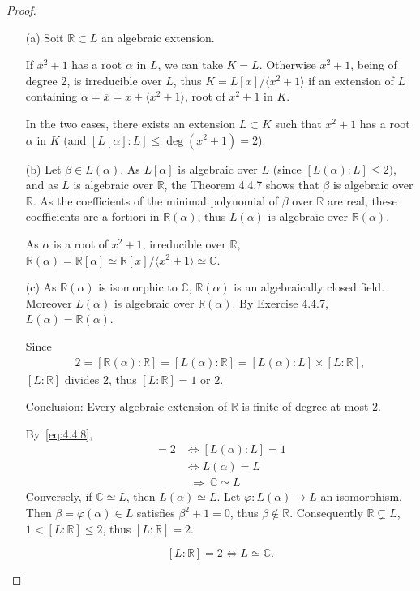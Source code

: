 \documentclass[11pt,a4paper]{article}
\newcommand{\R}{\mathbb{R}}
\newcommand{\C}{\mathbb{C}}
\begin{document}
\begin{proof}
\begin{enumerate}
\item[(a)]
Soit $\R \subset L$ an algebraic extension. 

If  $x^2+1$ has a root $\alpha$ in $L$, we can take  $K=L$. Otherwise $x^2+1$, being of degree 2, is irreducible over $L$, thus $K = L[x]/\langle x^2 +1\rangle$ if an extension of $L$ containing $\alpha = \overline{x} = x +\langle x^2 +1\rangle $, root of $x^2+1$ in $K$. 

In the two cases, there exists  an extension $L \subset K$ such that $x^2+1$ has a root $\alpha$ in $K$ (and $ [L[\alpha]:L] \leq \deg(x^2+1) = 2$).

\item[(b)] Let $\beta \in L(\alpha)$. As $L[\alpha]$ is algebraic over $L$ (since $[L(\alpha) : L] \leq 2)$, and as $L$ is algebraic over $\R$, the Theorem 4.4.7 shows that $\beta$ is algebraic over $\R$. As the coefficients of the minimal polynomial of $\beta$ over $\R$ are real, these coefficients are a fortiori in $\R(\alpha)$, thus $L(\alpha)$ is algebraic over $\R(\alpha)$.

As  $\alpha$ is a root of $x^2+1$, irreducible over $\R$, $\R(\alpha) = \R[\alpha] \simeq \R[x]/\langle x^2+1\rangle \simeq \C$.

\item[(c)] 
As $\R(\alpha)$ is isomorphic to $\C$, $\R(\alpha)$ is an algebraically closed field. Moreover $L(\alpha)$ is algebraic over $\R(\alpha)$. By Exercise 4.4.7, $L(\alpha)=\R(\alpha)$.

Since
\begin{align}
2={[ \R(\alpha):\R]} = [L(\alpha) : \R] =  [L(\alpha) : L] \times [L:\R], \label{eq:4.4.8}
\end{align}
$[L:\R]$ divides 2, thus  $[L:\R] =  1$ or $2$.

Conclusion: Every algebraic extension of $\R$ is finite of degree at most 2.

By~\eqref{eq:4.4.8}, 
\begin{align*}
[L:\R] = 2 &\iff [L(\alpha) : L] = 1\\
&\iff L(\alpha) = L\\
&\ \ \Rightarrow\  \C\simeq L
\end{align*}
Conversely, if $\C \simeq L$, then $L(\alpha) \simeq L$. Let $\varphi : L(\alpha) \to L$ an isomorphism. Then $\beta = \varphi(\alpha)\in L$ satisfies $\beta^2 +1 = 0$, thus $\beta \not \in \R$. Consequently $\R \subsetneq L$, $1<[L : \R]\leq 2$, thus $[L:\R]= 2$.

$$[L:\R] = 2 \iff L \simeq \C.$$
\end{enumerate}
\end{proof}
\end{document}
